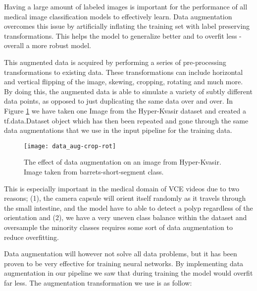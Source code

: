 \documentclass[thesis.tex]{subfiles}
\begin{document}
Having a large amount of labeled images is important for the performance of all medical image classification models to effectively learn. Data augmentation overcomes this issue by artificially inflating the training set with label preserving transformations. This helps the model to generalize better and to overfit less - overall a more robust model.

This augmented data is acquired by performing a series of pre-processing transformations to existing data. These transformations can include horizontal and vertical flipping of the image, skewing, cropping, rotating and much more. By doing this, the augmented data is able to simulate a variety of subtly different data points, as opposed to just duplicating the same data over and over. In Figure \ref{fig:data_aug-crop-rot} we have taken one Image from the Hyper-Kvasir dataset and created a tf.data.Dataset object which has then been repeated and gone through the same data augmentations that we use in the input pipeline for the training data.

\begin{figure} %
  \begin{center}
    \texttt{[image: data\_aug-crop-rot]}
    \caption[The effect of data augmentation on sample image.]{The effect of data augmentation on an image from Hyper-Kvasir. Image taken from barrets-short-segment class.}
    \label{fig:data_aug-crop-rot}
  \end{center}
\end{figure}

This is especially important in the medical domain of VCE videos due to two reasons; (1), the camera capsule will orient itself randomly as it travels through the small intestine, and the model have to able to detect a polyp regardless of the orientation and (2), we have a very uneven class balance within the dataset and oversample the minority classes requires some sort of data augmentation to reduce overfitting.

Data augmentation will however not solve all data problems, but it has been proven to be very effective for training neural networks. By implementing data augmentation in our pipeline we saw that during training the model would overfit far less. The augmentation transformation we use is as follow:
\end{document}
